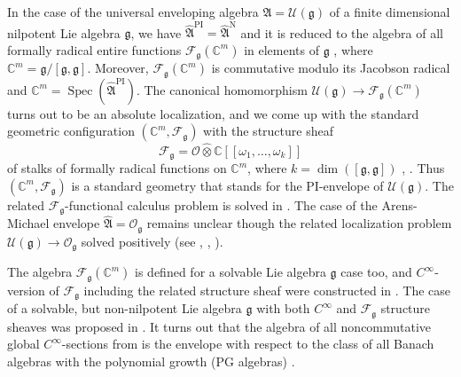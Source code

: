 \documentclass[12pt]{amsart}%
\theoremstyle{plain}
\numberwithin{equation}{section}
\numberwithin{equation}{section}
\numberwithin{theorem}{section}
\numberwithin{lemma}{section}
\numberwithin{remark}{section}
\numberwithin{example}{section}
\numberwithin{proposition}{section}
\numberwithin{definition}{section}
\numberwithin{corollary}{section}
\begin{document}
In the case of the universal enveloping algebra $\mathfrak{A}=\mathcal{U}%
\left(  \mathfrak{g}\right)  $ of a finite dimensional nilpotent Lie algebra
$\mathfrak{g}$, we have $\widehat{\mathfrak{A}}^{\text{PI}}%
=\widehat{\mathfrak{A}}^{\text{N}}$ and it is reduced to the algebra of all
formally radical entire functions $\mathcal{F}_{\mathfrak{g}}\left(
\mathbb{C}^{m}\right)  $ in elements of $\mathfrak{g}$ \cite{DosiAC}, where
$\mathbb{C}^{m}=\mathfrak{g/}\left[  \mathfrak{g},\mathfrak{g}\right]  $.
Moreover, $\mathcal{F}_{\mathfrak{g}}\left(  \mathbb{C}^{m}\right)  $ is
commutative modulo its Jacobson radical and $\mathbb{C}^{m}%
=\operatorname{Spec}\left(  \widehat{\mathfrak{A}}^{\text{PI}}\right)  $. The
canonical homomorphism $\mathcal{U}\left(  \mathfrak{g}\right)  \rightarrow
\mathcal{F}_{\mathfrak{g}}\left(  \mathbb{C}^{m}\right)  $ turns out to be an
absolute localization, and we come up with the standard geometric
configuration $\left(  \mathbb{C}^{m},\mathcal{F}_{\mathfrak{g}}\right)  $
with the structure sheaf
\[
\mathcal{F}_{\mathfrak{g}}=\mathcal{O}\widehat{\otimes}\mathbb{C}\left[
\left[  \omega_{1},\ldots,\omega_{k}\right]  \right]
\]
of stalks of formally radical functions on $\mathbb{C}^{m}$, where
$k=\dim\left(  \left[  \mathfrak{g},\mathfrak{g}\right]  \right)  $
\cite{DosJOT10}, \cite{DosiAC}. Thus $\left(  \mathbb{C}^{m},\mathcal{F}%
_{\mathfrak{g}}\right)  $ is a standard geometry that stands for the
PI-envelope of $\mathcal{U}\left(  \mathfrak{g}\right)  $. The related
$\mathcal{F}_{\mathfrak{g}}$-functional calculus problem is solved in
\cite{DosJOT10}. The case of the Arens-Michael envelope $\widehat{\mathfrak{A}%
}=\mathcal{O}_{\mathfrak{g}}$ remains unclear though the related localization
problem $\mathcal{U}\left(  \mathfrak{g}\right)  \rightarrow\mathcal{O}%
_{\mathfrak{g}}$ solved positively (see \cite{DosIzv}, \cite{PirSF},
\cite{Aris20}).

The algebra $\mathcal{F}_{\mathfrak{g}}\left(  \mathbb{C}^{m}\right)  $ is
defined for a solvable Lie algebra $\mathfrak{g}$ case too, and $C^{\infty}%
$-version of $\mathcal{F}_{\mathfrak{g}}$ including the related structure
sheaf were constructed in \cite{ArisI}. The case of a solvable, but
non-nilpotent Lie algebra $\mathfrak{g}$ with both $C^{\infty}$ and
$\mathcal{F}_{\mathfrak{g}}$ structure sheaves was proposed in \cite{Aris3}.
It turns out that the algebra of all noncommutative global $C^{\infty}%
$-sections from \cite{ArisI} is the envelope with respect to the class of all
Banach algebras with the polynomial growth (PG algebras) \cite{Aris}.
\end{document}
